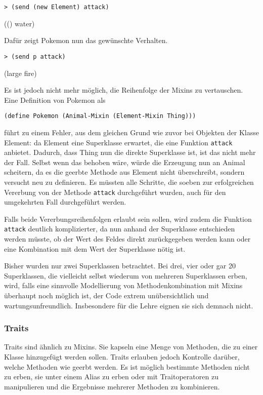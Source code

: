 \begin{lstlisting}
> (send (new Element) attack)
\end{lstlisting}
{\rsymbol (() water)}

Dafür zeigt Pokemon nun das gewünschte Verhalten.
\begin{lstlisting}
> (send p attack)
\end{lstlisting}
{\rsymbol (large fire)}

Es ist jedoch nicht mehr möglich, die Reihenfolge der Mixins zu vertauschen. Eine Definition von Pokemon als

\begin{lstlisting}
(define Pokemon (Animal-Mixin (Element-Mixin Thing)))
\end{lstlisting}

führt zu einem Fehler, aus dem gleichen Grund wie zuvor bei Objekten der Klasse Element: da Element eine Superklasse erwartet, die eine Funktion \texttt{attack} anbietet. Dadurch, dass Thing nun die direkte Superklasse ist, ist das nicht mehr der Fall. Selbst wenn das behoben wäre, würde die Erzeugung nun an Animal scheitern, da es die geerbte Methode aus Element nicht überschreibt, sondern versucht neu zu definieren. Es müssten alle Schritte, die soeben zur erfolgreichen Vererbung von der Methode \texttt{attack} durchgeführt wurden, auch für den umgekehrten Fall durchgeführt werden. 

Falls beide Vererbungsreihenfolgen erlaubt sein sollen, wird zudem die Funktion \texttt{attack} deutlich komplizierter, da nun anhand der Superklasse entschieden werden müsste, ob der Wert des Feldes direkt zurückgegeben werden kann oder eine Kombination mit dem Wert der Superklasse nötig ist.

Bisher wurden nur zwei Superklassen betrachtet. Bei drei, vier oder gar 20 Superklassen, die vielleicht selbst wiederum von mehreren Superklassen erben, wird, falls eine sinnvolle Modellierung von Methodenkombination mit Mixins überhaupt noch möglich ist, der Code extrem unübersichtlich und wartungsunfreundlich. Insbesondere für die Lehre eignen sie sich demnach nicht.

\subsubsection{Traits}
Traits sind ähnlich zu Mixins. Sie kapseln eine Menge von Methoden, die zu einer Klasse hinzugefügt werden sollen. Traits erlauben jedoch Kontrolle darüber, welche Methoden wie geerbt werden. Es ist möglich bestimmte Methoden nicht zu erben, sie unter einem Alias zu erben oder mit Traitoperatoren zu manipulieren und die Ergebnisse mehrerer Methoden zu kombinieren.

